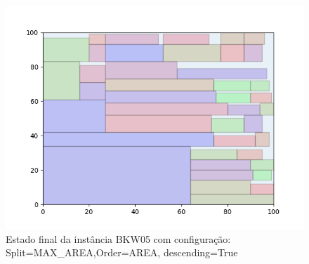 \begin{figure}[H]
    \centering
    \caption[]{Estado final da instância BKW05 com configuração: Split=MAX_AREA,Order=AREA, descending=True}
    \label{fig:bkw05-max_area-area-true}
    \includegraphics[scale=0.5]{output/figures/bkw/bkw05/max_area/area/true/00}
\end{figure}